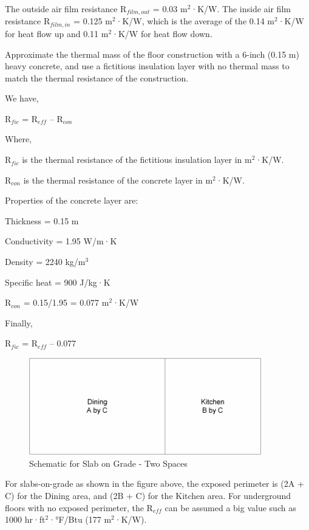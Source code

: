 The outside air film resistance R\(_{film,out}\) = 0.03 m\(^{2}\)·K/W. The inside air film resistance R\(_{film,in}\) = 0.125 m\(^{2}\)·K/W, which is the average of the 0.14 m\(^{2}\)·K/W for heat flow up and 0.11 m\(^{2}\)·K/W for heat flow down.

Approximate the thermal mass of the floor construction with a 6-inch (0.15 m) heavy concrete, and use a fictitious insulation layer with no thermal mass to match the thermal resistance of the construction.

We have,

R\(_{fic}\) = R\(_{eff}\) -- R\(_{con}\)

Where,

R\(_{fic}\) is the thermal resistance of the fictitious insulation layer in m\(^{2}\)·K/W.

R\(_{con}\) is the thermal resistance of the concrete layer in m\(^{2}\)·K/W.

Properties of the concrete layer are:

Thickness = 0.15 m

Conductivity = 1.95 W/m·K

Density = 2240 kg/m\(^{3}\)

Specific heat = 900 J/kg·K

R\(_{con}\) = 0.15/1.95 = 0.077 m\(^{2}\)·K/W

Finally,

R\(_{fic}\) = R\(_{eff}\) -- 0.077

\begin{figure}[hbtp] %
\centering
\includegraphics[width=0.9\textwidth, height=0.9\textheight, keepaspectratio=true]{media/image435.png}
\caption{Schematic for Slab on Grade - Two Spaces \protect \label{fig:schematic-for-slab-on-grade-two-spaces}}
\end{figure}

For slabs-on-grade as shown in the figure above, the exposed perimeter is (2A + C) for the Dining area, and (2B + C) for the Kitchen area. For underground floors with no exposed perimeter, the R\(_{eff}\) can be assumed a big value such as 1000 hr·ft\(^{2}\)·°F/Btu (177 m\(^{2}\)·K/W).

